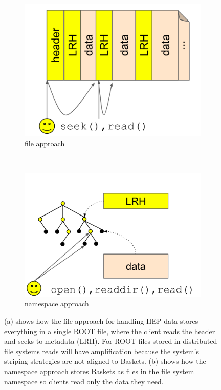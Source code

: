 \begin{figure}[t!]
    \centering
    \begin{subfigure}[b]{.5\linewidth}
      \centering
      \includegraphics[width=1.0\linewidth]{figures/tree_hep_a.png} 
      \caption{file approach}
      \label{fig:tree_hep_a}
    \end{subfigure}
    ~ 
    \begin{subfigure}[b]{.5\linewidth}
      \centering
      \includegraphics[width=1.0\linewidth]{figures/tree_hep_b.png} 
      \caption{namespace approach}
      \label{fig:tree_hep_b}
    \end{subfigure}
    \caption{(a) shows how the file approach for handling HEP data stores
everything in a single ROOT file, where the client reads the header and seeks
to metadata (LRH). For ROOT files stored in distributed file systems reads will
have amplification because the system's striping strategies are not aligned to
Baskets. (b) shows how the namespace approach stores Baskets as files in the
file system namespace so clients read only the data they need.}
\end{figure}

